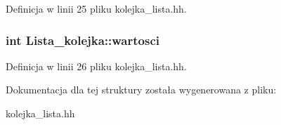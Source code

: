 \-Definicja w linii 25 pliku kolejka\-\_\-lista.\-hh.

\hypertarget{struct_lista__kolejka_ac8991eb71fc123a0a1318e1e6214aec7}{
\subsubsection[{wartosci}]{\setlength{\rightskip}{0pt plus 5cm}int {\bf \-Lista\-\_\-kolejka\-::wartosci}}}\label{struct_lista__kolejka_ac8991eb71fc123a0a1318e1e6214aec7}


\-Definicja w linii 26 pliku kolejka\-\_\-lista.\-hh.



\-Dokumentacja dla tej struktury została wygenerowana z pliku\-:\begin{DoxyCompactItemize}
\item 
kolejka\-\_\-lista.\-hh\end{DoxyCompactItemize}

